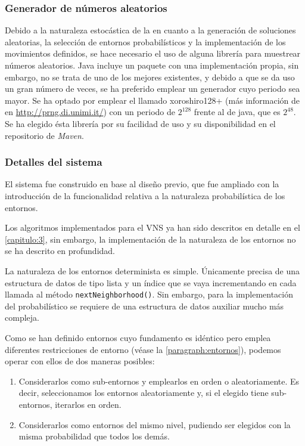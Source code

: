 \subsubsection{Generador de números aleatorios}
\label{sec:4:impl:random}

Debido a la naturaleza estocástica de la \fasedos{} en cuanto a la generación de soluciones aleatorias, la selección de entornos probabilísticos y la implementación de los movimientos definidos, se hace necesario el uso de alguna librería para muestrear números aleatorios. Java incluye un paquete con una implementación propia, sin embargo, no se trata de uno de los mejores existentes, y debido a que se da uso un gran número de veces, se ha preferido emplear un generador cuyo periodo sea mayor. Se ha optado por emplear el llamado xoroshiro128+ (más información de en \url{http://prng.di.unimi.it/}) con un periodo de $2^{128}$ frente al de java, que es $2^{48}$. Se ha elegido ésta librería por su facilidad de uso y su disponibilidad en el repositorio de \textit{Maven}.

\subsubsection{Detalles del sistema}
\label{sec:4:detalles-sistema}

El sistema fue construido en base al diseño previo, que fue ampliado con la introducción de la funcionalidad relativa a la naturaleza probabilística de los entornos.

Los algoritmos implementados para el VNS ya han sido descritos en detalle en el \autoref{capitulo:3}, sin embargo, la implementación de la naturaleza de los entornos no se ha descrito en profundidad.

La naturaleza de los entornos determinista es simple. Únicamente precisa de una estructura de datos de tipo lista y un índice que se vaya incrementando en cada llamada al método \texttt{nextNeighborhood()}. Sin embargo, para la implementación del probabilístico se requiere de una estructura de datos auxiliar mucho más compleja.

Como se han definido entornos cuyo fundamento es idéntico pero emplea diferentes restricciones de entorno (véase la \autoref{paragraph:entornos}), podemos operar con ellos de dos maneras posibles: 
\begin{enumerate}[label={(\Alph*)}]
	\item Considerarlos como sub-entornos y emplearlos en orden o aleatoriamente. Es decir, seleccionamos los entornos aleatoriamente y, si el elegido tiene sub-entornos, iterarlos en orden.
	\item \label{modelo-no-ordenado} Considerarlos como entornos del mismo nivel, pudiendo ser elegidos con la misma probabilidad que todos los demás.
\end{enumerate}

